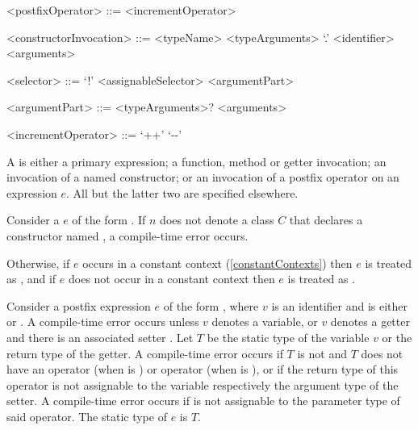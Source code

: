 \documentclass[makeidx]{article}
\begin{document}
{\begin{grammar}
<postfixOperator> ::= <incrementOperator>

<constructorInvocation> ::= \gnewline{}
  <typeName> <typeArguments> `.' <identifier> <arguments>

<selector> ::= `!'
  \alt <assignableSelector>
  \alt <argumentPart>

<argumentPart> ::=
  <typeArguments>? <arguments>

<incrementOperator> ::= `++'
  \alt `-\mbox-'
\end{grammar}

\LMHash{}%
A  is either a primary expression;
a function, method or getter invocation;
an invocation of a named constructor;
or an invocation of a postfix operator on an expression $e$.
All but the latter two are specified elsewhere.

\LMHash{}%
Consider a  $e$ of the form
.
If $n$ does not denote a class $C$
that declares a constructor named ,
a compile-time error occurs.

\LMHash{}%
Otherwise, if $e$ occurs in a constant context
(\ref{constantContexts})
then $e$ is treated as ,
and if $e$ does not occur in a constant context
then $e$ is treated as .

\EndCase

\LMHash{}%
Consider a postfix expression $e$ of the form ,
where $v$ is an identifier and \op{} is either \lit{++} or \lit{-{}-}.
A compile-time error occurs unless $v$ denotes a variable,
or $v$ denotes a getter and there is an associated setter .
Let $T$ be the static type of the variable $v$ or the return type of the getter.
A compile-time error occurs if $T$ is not \DYNAMIC{}
and $T$ does not have an operator \lit{+} (when \op{} is \lit{++})
or operator \lit{-} (when \op{} is \lit{-{}-}),
or if the return type of this operator is not assignable to
the variable respectively the argument type of the setter.
A compile-time error occurs if  is not assignable to
the parameter type of said operator.
The static type of $e$ is $T$.

}
\end{document}
